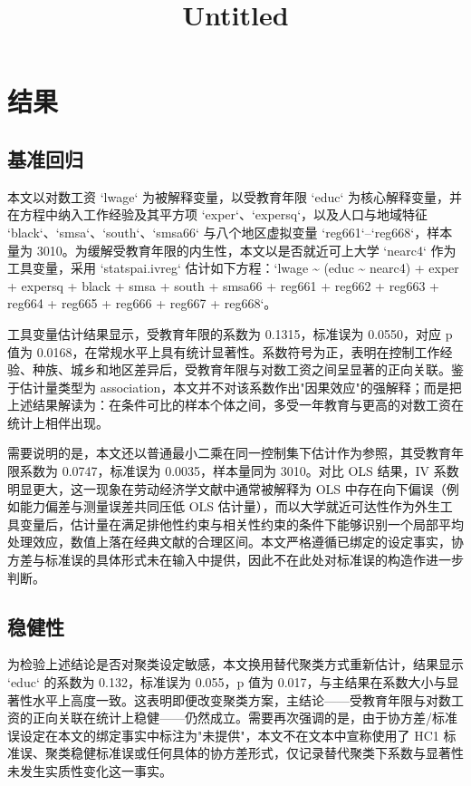 \documentclass[12pt,a4paper]{article}
\title{Untitled}
\author{}
\date{}
\begin{document}
\maketitle



\section{结果}

\subsection{基准回归}

本文以对数工资 `lwage` 为被解释变量，以受教育年限 `educ` 为核心解释变量，并在方程中纳入工作经验及其平方项 `exper`、`expersq`，以及人口与地域特征 `black`、`smsa`、`south`、`smsa66` 与八个地区虚拟变量 `reg661`–`reg668`，样本量为 3010。为缓解受教育年限的内生性，本文以是否就近可上大学 `nearc4` 作为工具变量，采用 `statspai.ivreg` 估计如下方程：`lwage \textasciitilde{} (educ \textasciitilde{} nearc4) + exper + expersq + black + smsa + south + smsa66 + reg661 + reg662 + reg663 + reg664 + reg665 + reg666 + reg667 + reg668`。

工具变量估计结果显示，受教育年限的系数为 0.1315，标准误为 0.0550，对应 p 值为 0.0168，在常规水平上具有统计显著性。系数符号为正，表明在控制工作经验、种族、城乡和地区差异后，受教育年限与对数工资之间呈显著的正向关联。鉴于估计量类型为 association，本文并不对该系数作出"因果效应"的强解释；而是把上述结果解读为：在条件可比的样本个体之间，多受一年教育与更高的对数工资在统计上相伴出现。

需要说明的是，本文还以普通最小二乘在同一控制集下估计作为参照，其受教育年限系数为 0.0747，标准误为 0.0035，样本量同为 3010。对比 OLS 结果，IV 系数明显更大，这一现象在劳动经济学文献中通常被解释为 OLS 中存在向下偏误（例如能力偏差与测量误差共同压低 OLS 估计量），而以大学就近可达性作为外生工具变量后，估计量在满足排他性约束与相关性约束的条件下能够识别一个局部平均处理效应，数值上落在经典文献的合理区间。本文严格遵循已绑定的设定事实，协方差与标准误的具体形式未在输入中提供，因此不在此处对标准误的构造作进一步判断。

\subsection{稳健性}

为检验上述结论是否对聚类设定敏感，本文换用替代聚类方式重新估计，结果显示 `educ` 的系数为 0.132，标准误为 0.055，p 值为 0.017，与主结果在系数大小与显著性水平上高度一致。这表明即便改变聚类方案，主结论——受教育年限与对数工资的正向关联在统计上稳健——仍然成立。需要再次强调的是，由于协方差/标准误设定在本文的绑定事实中标注为"未提供"，本文不在文本中宣称使用了 HC1 标准误、聚类稳健标准误或任何具体的协方差形式，仅记录替代聚类下系数与显著性未发生实质性变化这一事实。
\end{document}
